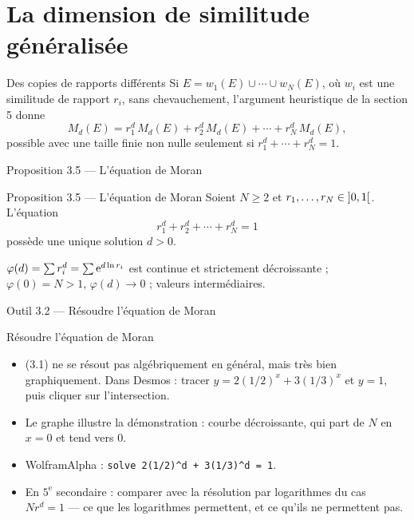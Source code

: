 \section{La dimension de similitude généralisée}

\begin{frame}{Des copies de rapports différents}
  \small Si $E = w_1(E)\cup\cdots\cup w_N(E)$, où $w_i$ est une
  similitude de rapport $r_i$, sans chevauchement, l'argument
  heuristique de la section 5 donne
  \[
    M_d(E) = r_1^d\,M_d(E)+r_2^d\,M_d(E)+\cdots+r_N^d\,M_d(E),
  \]
  possible avec une taille finie non nulle seulement si
  $r_1^d+\cdots+r_N^d = 1$.
\end{frame}

\begin{frame}{Proposition 3.5 --- L'équation de Moran}
  \begin{Enonce}{Proposition 3.5 --- L'équation de Moran}
    Soient $N\geq2$ et $r_1,\dots,r_N\in\mathopen{]}{0},{1}\mathclose{[}$. L'équation
    \[
      r_1^d+r_2^d+\cdots+r_N^d = 1 \tag{3.1}
    \]
    possède une unique solution $d>0$.
  \end{Enonce}
  \begin{AuTableau}
    \footnotesize $\varphi(d)=\sum r_i^d=\sum\operatorname{e}^{d\ln r_i}$ est continue
    et strictement décroissante ; $\varphi(0)=N>1$, $\varphi(d)\to0$ ;
    valeurs intermédiaires.
  \end{AuTableau}
\end{frame}

\begin{frame}{Outil 3.2 --- Résoudre l'équation de Moran}
  \begin{Outil}{Résoudre l'équation de Moran}
    \small
    \begin{itemize}
      \item (3.1) ne se résout pas algébriquement en général, mais très
        bien graphiquement. Dans Desmos : tracer
        $y = 2(1/2)^x+3(1/3)^x$ et $y=1$, puis cliquer sur l'intersection.
      \item Le graphe illustre la démonstration : courbe décroissante,
        qui part de $N$ en $x=0$ et tend vers $0$.
      \item WolframAlpha : \texttt{solve 2(1/2)\^{}d + 3(1/3)\^{}d = 1}.
      \item En $5^{\text{e}}$ secondaire : comparer avec la résolution
        par logarithmes du cas $Nr^d=1$ --- ce que les logarithmes
        permettent, et ce qu'ils ne permettent pas.
    \end{itemize}
  \end{Outil}
\end{frame}

